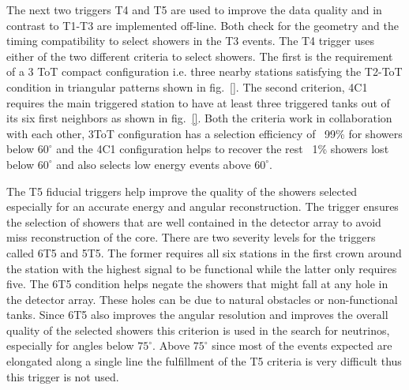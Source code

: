 The next two triggers T4 and T5 are used to improve the data quality and in contrast to T1-T3 are implemented off-line. Both check for the geometry and the timing compatibility to select showers in the T3 events. The T4 trigger uses either of the two different criteria to select showers. The first is the requirement of a 3 ToT compact configuration i.e. three nearby stations satisfying the T2-ToT condition in triangular patterns shown in fig.~\ref{}. The second criterion, 4C1 requires the main triggered station to have at least three triggered tanks out of its six first neighbors as shown in fig.~\ref{}. Both the criteria work in collaboration with each other, 3ToT configuration has a selection efficiency of ~99\% for showers below $60^{\circ}$ and the 4C1 configuration helps to recover the rest ~1\% showers lost below $60^{\circ}$ and also selects low energy events above $60^{\circ}$.

The T5 fiducial triggers help improve the quality of the showers selected especially for an accurate energy and angular reconstruction. The trigger ensures the selection of showers that are well contained in the detector array to avoid miss reconstruction of the core. There are two severity levels for the triggers called 6T5 and 5T5. The former requires all six stations in the first crown around the station with the highest signal to be functional while the latter only requires five. The 6T5 condition helps negate the showers that might fall at any hole in the detector array. These holes can be due to natural obstacles or non-functional tanks. Since 6T5 also improves the angular resolution and improves the overall quality of the selected showers this criterion is used in the search for neutrinos, especially for angles below $75^{\circ}$. Above $75^{\circ}$ since most of the events expected are elongated along a single line the fulfillment of the T5 criteria is very difficult thus this trigger is not used. 

